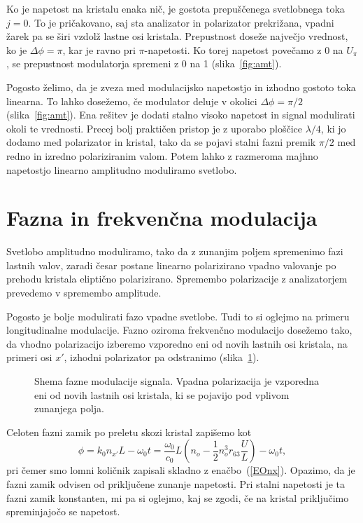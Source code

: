 Ko je napetost na kristalu enaka nič, je gostota prepuščenega svetlobnega toka 
$j=0$. To je pričakovano, saj sta analizator in polarizator prekrižana, 
vpadni žarek pa se širi vzdolž lastne osi kristala.
Prepustnost doseže največjo vrednost, ko je $\Delta \phi=\pi$, kar je ravno pri 
$\pi$-napetosti. Ko torej napetost povečamo z 0 na $U_\pi$, se
prepustnost modulatorja spremeni z 0 na 1 (slika~\ref{fig:amt}).

Pogosto želimo, da je zveza med modulacijsko napetostjo in izhodno
gostoto toka linearna. To lahko dosežemo, če modulator deluje v okolici $\Delta\phi=\pi/2$
(slika~\ref{fig:amt}).
Ena rešitev je dodati stalno visoko napetost in signal modulirati okoli
te vrednosti. Precej bolj praktičen pristop je z uporabo ploščice $\lambda/4$,
ki jo dodamo med polarizator in kristal, tako da se pojavi stalni
fazni premik $\pi/2$ med redno in izredno polariziranim valom. Potem lahko z razmeroma majhno napetostjo
linearno amplitudno moduliramo svetlobo.

\section{Fazna in frekvenčna modulacija}
Svetlobo amplitudno moduliramo, tako da z zunanjim
poljem spremenimo fazi lastnih valov, zaradi česar postane linearno
polarizirano vpadno valovanje po prehodu kristala eliptično polarizirano.
Spremembo polarizacije z analizatorjem prevedemo v spremembo amplitude.

Pogosto je bolje modulirati fazo vpadne svetlobe. Tudi to si oglejmo na primeru longitudinalne
 modulacije. Fazno oziroma 
 frekvenčno modulacijo dosežemo tako,
da vhodno polarizacijo izberemo vzporedno eni od novih lastnih osi kristala, 
na primeri osi $x'$, izhodni polarizator pa odstranimo (slika~\ref{fig:fmshema}). 
\begin{figure}[ht]
\centering
\def\svgwidth{80truemm} 

\caption{Shema fazne modulacije signala. Vpadna polarizacija je vzporedna eni od 
novih lastnih osi kristala, ki se pojavijo pod vplivom zunanjega polja.}
\label{fig:fmshema}
\end{figure}

Celoten fazni zamik po preletu skozi kristal zapišemo kot 
\begin{equation}
\phi =  k_0 n_{x'} L -\omega_0 t= \frac{\omega_0}{c_0}L \left(n_o -
\frac{1}{2}n_o^3 r_{63}\frac{U}{L}\right)-\omega_0 t,
\label{fmphi}
\end{equation}
pri čemer smo lomni količnik zapisali skladno z enačbo~(\ref{EOnx}). Opazimo,
da je fazni zamik odvisen od priključene zunanje napetosti. Pri stalni napetosti je 
ta fazni zamik konstanten, mi pa si oglejmo, kaj se zgodi, če na kristal priključimo
spreminjajočo se napetost.

